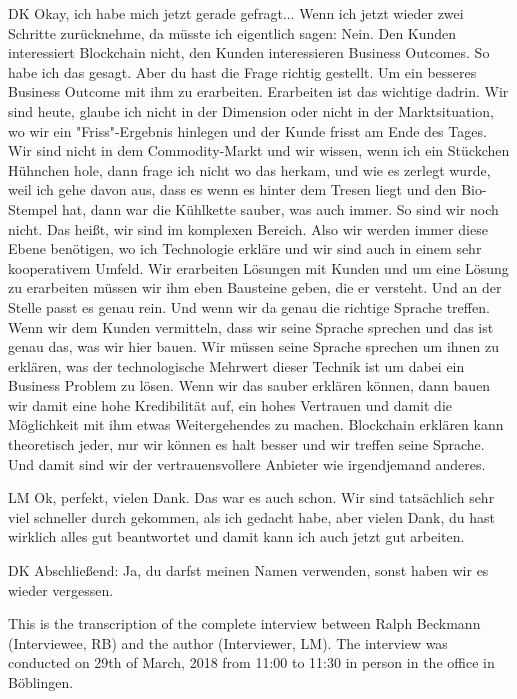 \begin{xlist}
     \item[DK] Okay, ich habe mich jetzt gerade gefragt... Wenn ich jetzt wieder zwei Schritte zurücknehme, da müsste ich eigentlich sagen: Nein. Den Kunden interessiert Blockchain nicht, den Kunden interessieren Business Outcomes. So habe ich das gesagt. Aber du hast die Frage richtig gestellt. Um ein besseres Business Outcome mit ihm zu erarbeiten. Erarbeiten ist das wichtige dadrin. Wir sind heute, glaube ich nicht in der Dimension oder nicht in der Marktsituation, wo wir ein "Friss"-Ergebnis hinlegen und der Kunde frisst am Ende des Tages. Wir sind nicht in dem Commodity-Markt und wir wissen, wenn ich ein Stückchen Hühnchen hole, dann frage ich nicht wo das herkam, und wie es zerlegt wurde, weil ich gehe davon aus, dass es wenn es hinter dem Tresen liegt und den Bio-Stempel hat, dann war die Kühlkette sauber, was auch immer. So sind wir noch nicht. Das heißt, wir sind im komplexen Bereich. Also wir werden immer diese Ebene benötigen, wo ich Technologie erkläre und wir sind auch in einem sehr kooperativem Umfeld. Wir erarbeiten Lösungen mit Kunden und um eine Lösung zu erarbeiten müssen wir ihm eben Bausteine geben, die er versteht. Und an der Stelle passt es genau rein. Und wenn wir da genau die richtige Sprache treffen. Wenn wir dem Kunden vermitteln, dass wir seine Sprache sprechen und das ist genau das, was wir hier bauen. Wir müssen seine Sprache sprechen um ihnen zu erklären, was der technologische Mehrwert dieser Technik ist um dabei ein Business Problem zu lösen. Wenn wir das sauber erklären können, dann bauen wir damit eine hohe Kredibilität auf, ein hohes Vertrauen und damit die Möglichkeit mit ihm etwas Weitergehendes zu machen. Blockchain erklären kann theoretisch jeder, nur wir können es halt besser und wir treffen seine Sprache. Und damit sind wir der vertrauensvollere Anbieter wie irgendjemand anderes.
     \item[LM] Ok, perfekt, vielen Dank. Das war es auch schon. Wir sind tatsächlich sehr viel schneller durch gekommen, als ich gedacht habe, aber vielen Dank, du hast wirklich alles gut beantwortet und damit kann ich auch jetzt gut arbeiten.
     \item[DK] Abschließend: Ja, du darfst meinen Namen verwenden, sonst haben wir es wieder vergessen. 
\end{xlist}

\label{anhang:InterviewRB}

This is the transcription of the complete interview between Ralph Beckmann (Interviewee, RB) and the author (Interviewer, LM). The interview was conducted on 29th of March, 2018 from 11:00 to 11:30 in person in the office in Böblingen.

